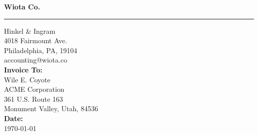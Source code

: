 \documentclass{invoice}
\def \tab {\hspace*{3ex}}
\begin{document}
\hfil{\Huge\bf Wiota Co.}\hfil
\bigskip\break
\hrule
Hinkel \& Ingram \\
4018 Fairmount Ave. \\
Philadelphia, PA, 19104 \\
accounting@wiota.co \\

{\bf Invoice To:} \\
\tab Wile E. Coyote \\
\tab ACME Corporation \\
\tab 361 U.S. Route 163 \\
\tab Monument Valley, Utah, 84536 \\

{\bf Date:} \\
\tab \today \\


\begin{invoiceTable}
\subtotal
{}
\subtotal*
\end{invoiceTable}
\end{document}
